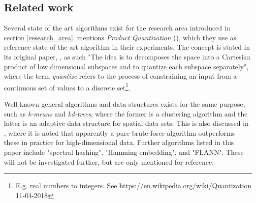 \subsection{Related work}
\label{state_of_the_art}
Several state of the art algorithms exist for the research area introduced in section \ref{research_area}. \cite{wagner17} mentions \textit{Product Quantization} (\pq{}), which they use as reference state of the art algorithm in their experiments. The \pq{} concept is stated in its original paper, \cite{schmid9}, as such "The idea is to decomposes the space into a Cartesian product of low dimensional subspaces and to quantize each subspace separately", where the term \textit{quantize} refers to the process of constraining an input from a continuous set of values to a discrete set\footnote{E.g. real numbers to integers. See https://en.wikipedia.org/wiki/Quantization 11-04-2018}.

Well known general algorithms and data structures exists for the same purpose, such as \textit{k-means} and \textit{kd-trees}, where the former is a clustering algorithm and the latter is an adaptive data structure for spatial data sets. This is also discussed in \cite{schmid9}, where it is noted that apparently a pure brute-force algorithm outperforms these in practice for high-dimensional data. Further algorithms listed in this paper include "spectral hashing"\cite{weiss8}, "Hamming embedding"\cite{jegou8}, and "FLANN"\cite{muja9}. These will not be investigated further, but are only mentioned for reference.


